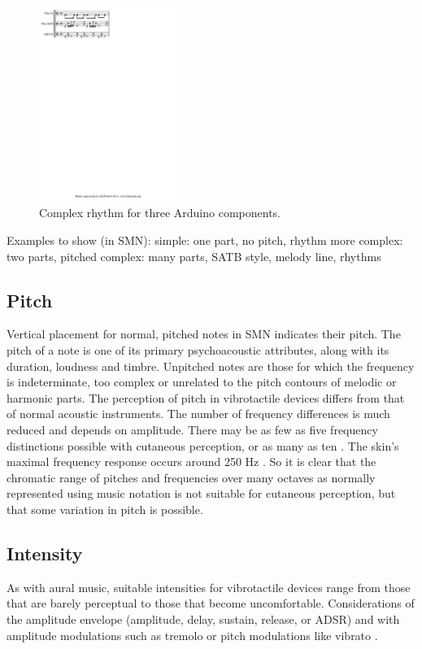 \documentclass[a4paper, twocolumn]{article}
\begin{document}
\begin{figure}[htb]
    \begin{center}
        \includegraphics[width=0.4\textwidth]{graphics/drums1-multistaff.pdf}
    \end{center}
    \caption{Complex rhythm for three Arduino components.\label{fig:fig4}}
\end{figure}


Examples to show (in SMN):
simple: one part, no pitch, rhythm
more complex: two parts, pitched
complex: many parts, SATB style, melody line, rhythms

\subsection{Pitch}
Vertical placement for normal, pitched notes in SMN indicates their pitch. The pitch of a note is one of its primary psychoacoustic attributes, along with its duration, loudness and timbre. Unpitched notes are those for which the frequency is indeterminate, too complex or unrelated to the pitch contours of melodic or harmonic parts. The perception of pitch in vibrotactile devices differs from that of normal acoustic instruments. The number of frequency differences is much reduced and depends on amplitude. There may be as few as five frequency distinctions possible with cutaneous perception, or as many as ten \cite{van2003distilling}. The skin's maximal frequency response occurs around 250 Hz \cite{gunther2003cutaneous}. So it is clear that the chromatic range of pitches and frequencies over many octaves as normally represented using music notation is not suitable for cutaneous perception, but that some variation in pitch is possible. 

\subsection{Intensity}
As with aural music, suitable intensities for vibrotactile devices range from those that are barely perceptual to those that become uncomfortable. Considerations of the amplitude envelope (amplitude, delay, sustain, release, or ADSR) and with amplitude modulations such as tremolo or pitch modulations like vibrato \cite{gunther2003cutaneous}. 
\end{document}
